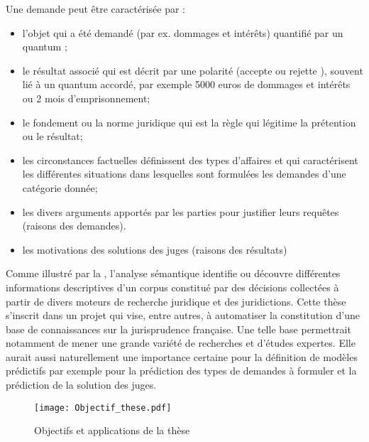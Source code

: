 Une demande peut être caractérisée par :
 \begin{itemize}
 	\item l'objet qui a été demandé (par ex. dommages et intérêts) quantifié par un quantum ;
	\item le résultat associé qui est décrit par une polarité (\og accepte \fg{} ou \og rejette \fg{}), souvent lié à un quantum accordé, par exemple 5000 euros de dommages et intérêts ou 2 mois d'emprisonnement;
	\item le fondement ou la norme juridique qui est la règle qui légitime la prétention ou le résultat;	
	\item les circonstances factuelles définissent des types d'affaires et qui caractérisent les différentes situations dans lesquelles sont formulées les demandes d'une catégorie donnée;
	\item les divers arguments apportés par les parties pour justifier leurs requêtes  (raisons des demandes).
	\item les motivations des solutions des juges (raisons des résultats)
 \end{itemize}

Comme illustré par la  , l'analyse sémantique identifie ou découvre différentes informations descriptives d'un corpus constitué par des décisions collectées à partir de divers moteurs de recherche juridique et des juridictions. Cette thèse s'inscrit dans un projet qui vise, entre autres, à automatiser la constitution d'une base de connaissances sur la jurisprudence française. Une telle base permettrait notamment de mener une grande variété de recherches et d'études expertes. Elle aurait aussi naturellement une importance certaine pour la définition de modèles prédictifs par exemple pour la prédiction des types de demandes à formuler et la prédiction de la solution des juges. 

\begin{figure}[!htb]
	\texttt{[image: Objectif\_these.pdf]}
	\caption{Objectifs et applications de la thèse} \label{fig:intro:objectif-these}
\end{figure} 

